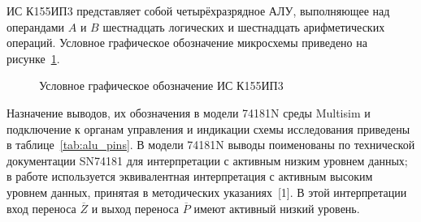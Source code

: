 \documentclass[14pt,a4paper]{extarticle}
\begin{document}
ИС К155ИП3 представляет собой четырёхразрядное АЛУ, выполняющее над операндами $A$ и $B$ шестнадцать логических и шестнадцать арифметических операций. Условное графическое обозначение микросхемы приведено на рисунке~\ref{fig:alu_ugo}.

\begin{figure}[H]
\centering
{}
\caption{Условное графическое обозначение ИС К155ИП3}
\label{fig:alu_ugo}
\end{figure}

Назначение выводов, их обозначения в модели 74181N среды Multisim и подключение к органам управления и индикации схемы исследования приведены в таблице~\ref{tab:alu_pins}. В модели 74181N выводы поименованы по технической документации SN74181 для интерпретации с активным низким уровнем данных; в работе используется эквивалентная интерпретация с активным высоким уровнем данных, принятая в методических указаниях~[1]. В этой интерпретации вход переноса $\overline{Z}$ и выход переноса $\overline{P}$ имеют активный низкий уровень.
\end{document}
